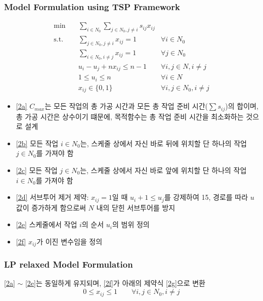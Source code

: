 \documentclass[10pt]{article}
\begin{document}
\subsubsection*{Model Formulation using TSP Framework}
\begin{subequations}
    \begin{align}
        \text{min} \quad & \sum_{i \in N_0} \sum_{j \in N_0, j \ne i} s_{ij} x_{ij} \label{2a}\\
        \text{s.t.} \quad
        & \sum_{j \in N_0, j \ne i} x_{ij} = 1 & \forall i \in N_0 \label{2b}\\
        & \sum_{i \in N_0, i \ne j} x_{ij} = 1 & \forall j \in N_0 \label{2c}\\
        & u_i - u_j + n x_{ij} \le n - 1 & \forall i, j \in N, i \ne j \label{2d}\\
        & 1 \le u_i \le n & \forall i \in N \label{2e} \\
        & x_{ij} \in \{0, 1\} & \forall i, j \in N_0, i \ne j \label{2f}
    \end{align}
\end{subequations}
\vspace{0.05em}
\begin{itemize} [leftmargin=1em, itemsep=0pt, topsep=1pt]
    \item \eqref{2a} $C_{max}$는 모든 작업의 총 가공 시간과 모든 총 작업 준비 시간($\sum s_{ij}$)의 합이며, 총 가공 시간은 상수이기 떄문에, 목적함수는 총 작업 준비 시간을 최소화하는 것으로 설계
    \item \eqref{2b} 모든 작업 $i \in N_0$는, 스케줄 상에서 자신 바로 뒤에 위치할 단 하나의 작업 $j \in N_0$를 가져야 함
    \item \eqref{2c} 모든 작업 $j \in N_0$는, 스케줄 상에서 자신 바로 앞에 위치할 단 하나의 작업 $i \in N_0$를 가져야 함
    \item \eqref{2d} 서브투어 제거 제약: $x_{ij}=1$일 때 $u_i + 1 \le u_j$를 강제하여 15, 경로를 따라 $u$ 값이 증가하게 함으로써 $N$ 내의 닫힌 서브투어를 방지
    \item \eqref{2e} 스케줄에서 작업 $i$의 순서 $u_i$의 범위 정의
    \item \eqref{2f} $x_{ij}$가 이진 변수임을 정의
\end{itemize}

\subsubsection*{LP relaxed Model Formulation}
\eqref{2a} $\sim$ \eqref{2e}는 동일하게 유지되며, \eqref{2f}가 아래의 제약식 \eqref{2g}으로 변환
\begin{equation*}
    0 \le x_{ij} \le 1 \qquad \forall i, j \in N_0, i \ne j \tag{2g} \label{2g}
\end{equation*}
\end{document}
